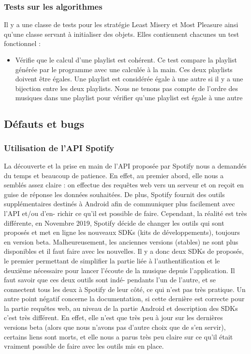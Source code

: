 \documentclass{article}
\begin{document}
        \subsubsection{Tests sur les algorithmes}
        Il y a une classe de tests pour les stratégie Least Misery et Most Pleasure ainsi qu'une classe servant à initialiser des objets. Elles contiennent chacunes un test fonctionnel : 
        \begin{itemize}
            \item Vérifie que le calcul d'une playlist est cohérent. Ce test compare la playlist générée par le programme avec une calculée à la main. Ces deux playlists doivent être égales. Une playlist est considérée égale à une autre si il y a une bijection entre les deux playlists. Nous ne tenons pas compte de l'ordre des musiques dans une playlist pour vérifier qu'une playlist est égale à une autre
        \end{itemize}
		
		\subsection{Défauts et bugs}
		\subsubsection{Utilisation de l'API Spotify}
		La découverte et la prise en main de l'API proposée par Spotify nous a demandés du temps et beaucoup de patience. En effet, au premier abord, elle nous a semblés assez claire : on effectue des requêtes web vers un serveur et on reçoit en guise de réponse les données souhaitées. De plus, Spotify fournit des outils supplémentaires destinés à Android afin de communiquer plus facilement avec l'API et/ou d'en- richir ce qu'il est possible de faire. Cependant, la réalité est très différente, en Novembre 2019, Spotify décide de changer les outils qui sont proposés et met en ligne les nouveaux SDKs (kits de développements), toujours en version beta. Malheureusement, les anciennes versions (stables) ne sont plus disponibles et il faut faire avec les nouvelles. Il y a donc deux SDKs de proposés, le premier permettant de simplifier la partie liée à l'authentification et le deuxième nécessaire pour lancer l'écoute de la musique depuis l'application. Il faut savoir que ces deux outils sont indé- pendants l'un de l'autre, et se connectent tous les deux à Spotify de leur côté, ce qui n'est pas très pratique. Un autre point négatif concerne la documentation, si cette dernière est correcte pour la partie requêtes web, au niveau de la partie Android et description des SDKs c'est très différent. En effet, elle n'est que très peu à jour sur les dernières versions beta (alors que nous n'avons pas d'autre choix que de s'en servir), certains liens sont morts, et elle nous a parus très peu claire sur ce qu'il était vraiment possible de faire avec les outils mis en place.
		
\end{document}

